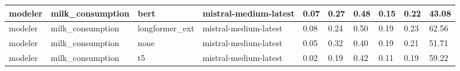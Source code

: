 \begin{tabular}{|l|l|l|l|l|l|l|l|l|l|}
 \hline
 modeler & milk\_consumption & bert & mistral-medium-latest & 0.07 & 0.27 & 0.48 & 0.15 & 0.22 & 43.08 \\
 \hline
 modeler & milk\_consumption & longformer\_ext & mistral-medium-latest & 0.08 & 0.24 & 0.50 & 0.19 & 0.23 & 62.56 \\
 \hline
 modeler & milk\_consumption & none & mistral-medium-latest & 0.05 & 0.32 & 0.40 & 0.19 & 0.21 & 51.71 \\
 \hline
 modeler & milk\_consumption & t5 & mistral-medium-latest & 0.02 & 0.19 & 0.42 & 0.11 & 0.19 & 59.22 \\
\hline
\end{tabular}
